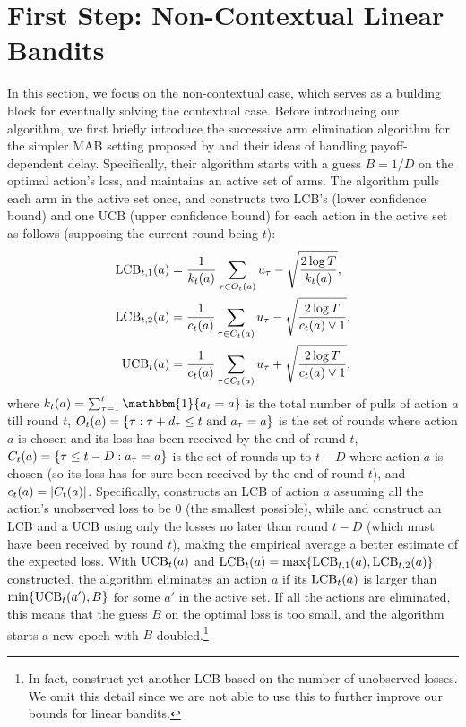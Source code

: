 \section{First Step: Non-Contextual Linear Bandits}\label{sec: linear}

In this section, we focus on the non-contextual case, which serves as a building block for eventually solving the contextual case. Before introducing our algorithm, we first briefly introduce the successive arm elimination algorithm for the simpler MAB setting proposed by \citet{schlisselberg2024delay} and their ideas of handling payoff-dependent delay. Specifically, their algorithm starts with a guess $B=1/D$ on the optimal action's loss, and maintains an active set of arms. The algorithm pulls each arm in the active set once, and constructs two LCB's (lower confidence bound) and one UCB (upper confidence bound) for each action in the active set as follows (supposing the current round being $t$):
\begin{align}
        {\operatorname{LCB}}_{t,1}(a) &= \frac{1}{k_t(a)}\sum_{\tau\in O_t(a)}u_\tau - \sqrt{\frac{2\log T}{k_t(a)}}, \label{eqn:lcb-1-mab}\\
        {\operatorname{LCB}}_{t,2}(a) &= \frac{1}{c_t(a)}\sum_{\tau\in C_t(a)}u_{\tau} - \sqrt{\frac{2\log T}{c_t(a)\vee 1}}, \label{eqn:lcb-2-mab}\\
        {\operatorname{UCB}}_{t}(a) &= \frac{1}{c_t(a)}\sum_{\tau\in C_t(a)}u_{\tau} + \sqrt{\frac{2\log T}{c_t(a)\vee 1}},\label{eqn:ucb-mab}
\end{align}
where $\cnt_t(a) = \sum_{\tau=1}^t\mathbbm{1}\{a_t=a\}$ is the total number of pulls of action $a$ till round $t$, $O_t(a) = \{\tau: \tau+d_{\tau}\leq t \text{~and~} a_{\tau}=a\}$ is the set of rounds where action $a$ is chosen and its loss has been received by the end of round $t$, $C_t(a) = \{\tau \leq t-D: a_\tau = a\}$ is the set of rounds up to $t-D$ where action $a$ is chosen (so its loss has for sure been received by the end of round $t$), 
and $c_t(a)=|C_t(a)|$. Specifically,  constructs an LCB of action $a$ assuming all the action's unobserved loss to be $0$ (the smallest possible), while  and  construct an LCB and a UCB using only the losses no later than round $t-D$ (which must have been received by round $t$), making the empirical average a better estimate of the expected loss. With ${\operatorname{UCB}}_t(a)$ and ${\operatorname{LCB}}_t(a) = \max\{{\operatorname{LCB}}_{t,1}(a), {\operatorname{LCB}}_{t,2}(a)\}$ constructed, the algorithm eliminates an action $a$ if its ${\operatorname{LCB}}_t(a)$ is larger than $\min\{{\operatorname{UCB}}_t(a'),B\}$ for some $a'$ in the active set. If all the actions are eliminated, this means that the guess $B$ on the optimal loss is too small, and the algorithm starts a new epoch with $B$ doubled.\footnote{In fact, \citet{schlisselberg2024delay} construct yet another LCB based on the number of unobserved losses. We omit this detail since we are not able to use this to further improve our bounds for linear bandits.}

